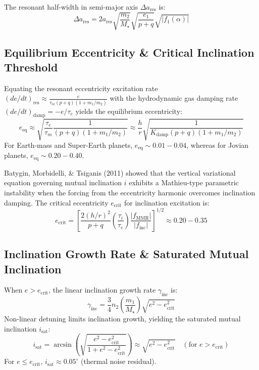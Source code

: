 \documentclass[11pt,a4paper]{article}
\begin{document}
The resonant half-width in semi-major axis $\Delta a_{\text{res}}$ is:
\begin{equation}
\Delta a_{\text{res}} = 2 a_{\text{res}} \sqrt{\frac{m_2}{M_\star}} \sqrt{\frac{e_1}{p+q}} \sqrt{|f_1(\alpha)|}
\label{eq:half_width}
\end{equation}

\subsection{Equilibrium Eccentricity \& Critical Inclination Threshold}
Equating the resonant eccentricity excitation rate $(de/dt)_{\text{res}} \approx \frac{e}{\tau_m (p+q) (1 + m_1/m_2)}$ with the hydrodynamic gas damping rate $(de/dt)_{\text{damp}} = -e/\tau_e$ yields the equilibrium eccentricity:
\begin{equation}
e_{\text{eq}} \approx \sqrt{\frac{\tau_e}{\tau_m} \frac{1}{(p+q)(1 + m_1/m_2)}} \approx \frac{h}{r} \sqrt{\frac{1}{K_{\text{damp}} (p+q) (1 + m_1/m_2)}}
\label{eq:e_eq}
\end{equation}
For Earth-mass and Super-Earth planets, $e_{\text{eq}} \sim 0.01 - 0.04$, whereas for Jovian planets, $e_{\text{eq}} \sim 0.20 - 0.40$.

Batygin, Morbidelli, \& Tsiganis (2011) showed that the vertical variational equation governing mutual inclination $i$ exhibits a Mathieu-type parametric instability when the forcing from the eccentricity harmonic overcomes inclination damping. The critical eccentricity $e_{\text{crit}}$ for inclination excitation is:
\begin{equation}
e_{\text{crit}} = \left[ \frac{2 (h/r)^2}{p+q} \left(\frac{\tau_i}{\tau_e}\right) \frac{|f_{\text{MMR}}|}{|f_{\text{inc}}|} \right]^{1/2} \approx 0.20 - 0.35
\label{eq:e_crit}
\end{equation}

\subsection{Inclination Growth Rate \& Saturated Mutual Inclination}
When $e > e_{\text{crit}}$, the linear inclination growth rate $\gamma_{\text{inc}}$ is:
\begin{equation}
\gamma_{\text{inc}} = \frac{3}{4} n_2 \left(\frac{m_1}{M_\star}\right) \sqrt{e^2 - e_{\text{crit}}^2}
\label{eq:gamma_inc}
\end{equation}
Non-linear detuning limits inclination growth, yielding the saturated mutual inclination $i_{\text{sat}}$:
\begin{equation}
i_{\text{sat}} = \arcsin\left( \sqrt{\frac{e^2 - e_{\text{crit}}^2}{1 + e^2 - e_{\text{crit}}^2}} \right) \approx \sqrt{e^2 - e_{\text{crit}}^2} \quad (\text{for } e > e_{\text{crit}})
\label{eq:i_sat}
\end{equation}
For $e \le e_{\text{crit}}$, $i_{\text{sat}} \approx 0.05^\circ$ (thermal noise residual).
\end{document}
